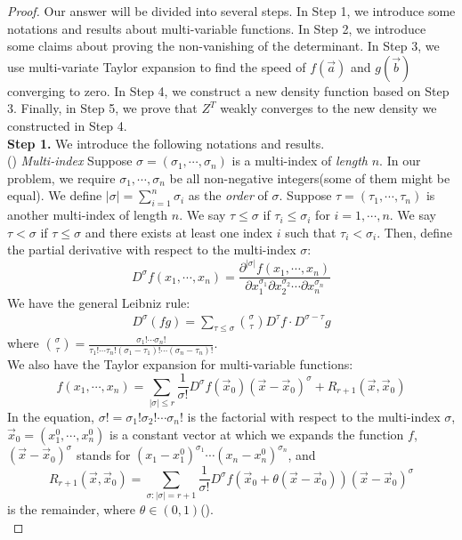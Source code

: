 \begin{proof}
Our answer will be divided into several steps. In Step 1, we introduce some notations and results about multi-variable functions. In Step 2, we introduce some claims about proving the non-vanishing of the determinant. In Step 3, we use multi-variate Taylor expansion to find the speed of $f(\vec{a})$ and $g(\vec{b})$ converging to zero. In Step 4, we construct a new density function based on Step 3. Finally, in Step 5, we prove that $Z^{T}$ weakly converges to the new density we constructed in Step 4.\\
\textbf{Step 1. } We introduce the following notations and results.\\
() \emph{Multi-index} Suppose $\sigma = (\sigma_{1},\cdots,\sigma_{n})$ is a multi-index of \emph{length} $n$. In our problem, we require $\sigma_{1},\cdots,\sigma_{n}$ be all non-negative integers(some of them might be equal). We define $|\sigma|=\sum_{i=1}^{n}\sigma_{i}$ as the \emph{order} of $\sigma$. Suppose $\tau=(\tau_{1},\cdots,\tau_{n})$ is another multi-index of length $n$. We say $\tau\leqslant \sigma$ if $\tau_{i}\leqslant \sigma_{i}$ for $i=1,\cdots,n$. We say $\tau<\sigma$ if $\tau\leqslant \sigma$ and there exists at least one index $i$ such that $\tau_{i}<\sigma_{i}$. Then, define the partial derivative with respect to the multi-index $\sigma$:
$$D^{\sigma}f(x_{1},\cdots,x_{n})=\frac{\partial^{|\sigma|}f(x_{1},\cdots,x_{n})}{\partial x_{1}^{\sigma_{1}}\partial x_{2}^{\sigma_{2}}\cdots \partial x_{n}^{\sigma_{n}}}$$ We have the general Leibniz rule:
\begin{align*}
	D^{\sigma}(fg)=\sum_{\tau\leqslant\sigma}\binom{\sigma}{\tau}D^{\tau}f\cdot D^{\sigma-\tau}g
\end{align*}
where $\binom{\sigma}{\tau}=\frac{\sigma_{1}!\cdots\sigma_{n}!}{\tau_{1}!\cdots\tau_{n}!(\sigma_{1}-\tau_{1})!\cdots(\sigma_{n}-\tau_{n})!}$.\\
We also have the Taylor expansion for multi-variable functions:
$$f(x_{1},\cdots,x_{n})=\sum_{|\sigma|\leqslant r}\frac{1}{\sigma!}D^{\sigma}f(\vec{x}_{0})(\vec{x}-\vec{x}_{0})^{\sigma}+R_{r+1}(\vec{x},\vec{x}_{0})$$ 
In the equation, $\sigma!=\sigma_{1}!\sigma_{2}!\cdots\sigma_{n}!$ is the factorial with respect to the multi-index $\sigma$, $\vec{x}_{0}=(x_{1}^{0},\cdots,x_{n}^{0})$ is a constant vector at which we expands the function $f$, $(\vec{x}-\vec{x}_{0})^{\sigma}$ stands for $(x_{1}-x_{1}^{0})^{\sigma_{1}}\cdots(x_{n}-x_{n}^{0})^{\sigma_{n}}$, and $$R_{r+1}(\vec{x},\vec{x}_{0})=\sum_{\sigma:|\sigma|=r+1}\frac{1}{\sigma!}D^{\sigma}f(\vec{x}_{0}+\theta(\vec{x}-\vec{x}_{0}))(\vec{x}-\vec{x}_{0})^{\sigma}$$ is the remainder, where $\theta\in (0,1)$(\cite[Theorem 3.18 \& Corollary 3.19]{CJ}).\\

\end{proof}
